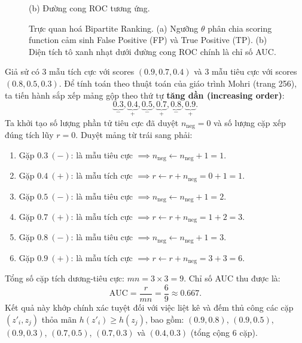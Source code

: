 \begin{figure}[H]
\begin{minipage}[b]{0.48\textwidth}
        \par\smallskip
        {\small (b) Đường cong ROC tương ứng.}
    \end{minipage}
    \caption{Trực quan hoá Bipartite Ranking. (a) Ngưỡng $\theta$ phân chia scoring function cảm sinh False Positive (FP) và True Positive (TP). (b) Diện tích tô xanh nhạt dưới đường cong ROC chính là chỉ số AUC.}
    \label{fig:bipartite_roc_concept}
\end{figure}

\begin{example}
Giả sử có 3 mẫu tích cực với scores $(0.9, 0.7, 0.4)$ và 3 mẫu tiêu cực với scores $(0.8, 0.5, 0.3)$. Để tính toán theo thuật toán của giáo trình Mohri (trang 256), ta tiến hành sắp xếp mảng gộp theo thứ tự \textbf{tăng dần (increasing order)}:
\[
    \underbrace{0.3}_{-}, \underbrace{0.4}_{+}, \underbrace{0.5}_{-}, \underbrace{0.7}_{+}, \underbrace{0.8}_{-}, \underbrace{0.9}_{+}.
\]
Ta khởi tạo số lượng phần tử tiêu cực đã duyệt $n_{\text{neg}} = 0$ và số lượng cặp xếp đúng tích lũy $r = 0$. Duyệt mảng từ trái sang phải:
\begin{enumerate}
    \item Gặp $0.3 \ (-)$: là mẫu tiêu cực $\implies n_{\text{neg}} \leftarrow n_{\text{neg}} + 1 = 1$.
    \item Gặp $0.4 \ (+)$: là mẫu tích cực $\implies r \leftarrow r + n_{\text{neg}} = 0 + 1 = 1$.
    \item Gặp $0.5 \ (-)$: là mẫu tiêu cực $\implies n_{\text{neg}} \leftarrow n_{\text{neg}} + 1 = 2$.
    \item Gặp $0.7 \ (+)$: là mẫu tích cực $\implies r \leftarrow r + n_{\text{neg}} = 1 + 2 = 3$.
    \item Gặp $0.8 \ (-)$: là mẫu tiêu cực $\implies n_{\text{neg}} \leftarrow n_{\text{neg}} + 1 = 3$.
    \item Gặp $0.9 \ (+)$: là mẫu tích cực $\implies r \leftarrow r + n_{\text{neg}} = 3 + 3 = 6$.
\end{enumerate}
Tổng số cặp tích dương-tiêu cực: $mn = 3 \times 3 = 9$. Chỉ số AUC thu được là:
\[
    \mathrm{AUC} = \frac{r}{mn} = \frac{6}{9} \approx 0.667.
\]
Kết quả này khớp chính xác tuyệt đối với việc liệt kê và đếm thủ công các cặp $(z'_i, z_j)$ thỏa mãn $h(z'_i) \ge h(z_j)$, bao gồm: $(0.9, 0.8)$, $(0.9, 0.5)$, $(0.9, 0.3)$, $(0.7, 0.5)$, $(0.7, 0.3)$ và $(0.4, 0.3)$ (tổng cộng $6$ cặp).
\end{example}

